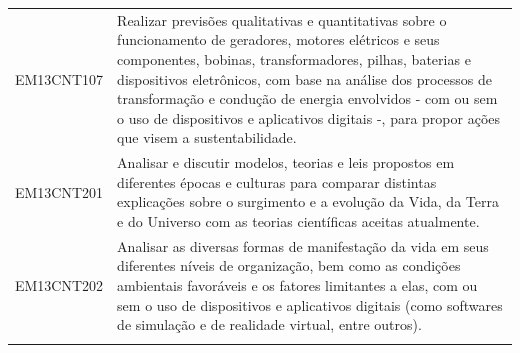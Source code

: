 \documentclass[12pt]{extarticle}
\begin{document}
\begin{longtable}{ll}
EM13CNT107 & Realizar previsões qualitativas e quantitativas sobre o funcionamento de geradores, motores elétricos e seus componentes, bobinas, transformadores, pilhas, baterias e dispositivos eletrônicos, com base na análise dos processos de transformação e condução de energia envolvidos - com ou sem o uso de dispositivos e aplicativos digitais -, para propor ações que visem a sustentabilidade.                                                                                                                                                                                                                                                                                                                                                                                                                     \\
\rowcolor[HTML]{E0F7FA} 
EM13CNT201 & Analisar e discutir modelos, teorias e leis propostos em diferentes épocas e culturas para comparar distintas explicações sobre o surgimento e a evolução da Vida, da Terra e do Universo com as teorias científicas aceitas atualmente.                                                                                                                                                                                                                                                                                                                                                                                                                                                                                                                                                                              \\
\rowcolor[HTML]{FFF} 
EM13CNT202 & Analisar as diversas formas de manifestação da vida em seus diferentes níveis de organização, bem como as condições ambientais favoráveis e os fatores limitantes a elas, com ou sem o uso de dispositivos e aplicativos digitais (como softwares de simulação e de realidade virtual, entre outros).                                                                                                                                                                                                                                                                                                                                                                                                                                                                                                                 \\
\rowcolor[HTML]{E0F7FA} 

\end{longtable}
\end{document}
